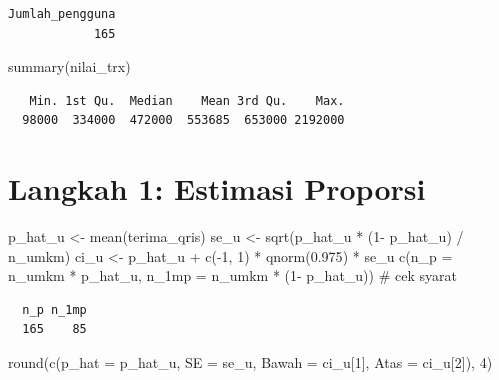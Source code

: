 \documentclass[
  indonesian,
  letterpaper,
]{book}
\newenvironment{Shaded}{\begin{snugshade}}{\end{snugshade}}
\newcommand{\AttributeTok}[1]{\textcolor[rgb]{0.40,0.45,0.13}{#1}}
\newcommand{\CommentTok}[1]{\textcolor[rgb]{0.37,0.37,0.37}{#1}}
\newcommand{\DecValTok}[1]{\textcolor[rgb]{0.68,0.00,0.00}{#1}}
\newcommand{\FloatTok}[1]{\textcolor[rgb]{0.68,0.00,0.00}{#1}}
\newcommand{\FunctionTok}[1]{\textcolor[rgb]{0.28,0.35,0.67}{#1}}
\newcommand{\NormalTok}[1]{\textcolor[rgb]{0.00,0.23,0.31}{#1}}
\newcommand{\OtherTok}[1]{\textcolor[rgb]{0.00,0.23,0.31}{#1}}
\newcommand{\SpecialCharTok}[1]{\textcolor[rgb]{0.37,0.37,0.37}{#1}}
\begin{document}
\begin{verbatim}
Jumlah_pengguna 
            165 
\end{verbatim}

\begin{Shaded}
\begin{Highlighting}[]
\FunctionTok{summary}\NormalTok{(nilai\_trx)}
\end{Highlighting}
\end{Shaded}

\begin{verbatim}
   Min. 1st Qu.  Median    Mean 3rd Qu.    Max. 
  98000  334000  472000  553685  653000 2192000 
\end{verbatim}

\section{Langkah 1: Estimasi
Proporsi}\label{langkah-1-estimasi-proporsi}

\begin{Shaded}
\begin{Highlighting}[]
\NormalTok{p\_hat\_u }\OtherTok{\textless{}{-}} \FunctionTok{mean}\NormalTok{(terima\_qris)}
\NormalTok{se\_u }\OtherTok{\textless{}{-}} \FunctionTok{sqrt}\NormalTok{(p\_hat\_u }\SpecialCharTok{*}\NormalTok{ (}\DecValTok{1}\SpecialCharTok{{-}}\NormalTok{ p\_hat\_u) }\SpecialCharTok{/}\NormalTok{ n\_umkm)}
\NormalTok{ci\_u }\OtherTok{\textless{}{-}}\NormalTok{ p\_hat\_u }\SpecialCharTok{+} \FunctionTok{c}\NormalTok{(}\SpecialCharTok{{-}}\DecValTok{1}\NormalTok{, }\DecValTok{1}\NormalTok{) }\SpecialCharTok{*} \FunctionTok{qnorm}\NormalTok{(}\FloatTok{0.975}\NormalTok{) }\SpecialCharTok{*}\NormalTok{ se\_u}
\FunctionTok{c}\NormalTok{(}\AttributeTok{n\_p =}\NormalTok{ n\_umkm }\SpecialCharTok{*}\NormalTok{ p\_hat\_u, }\AttributeTok{n\_1mp =}\NormalTok{ n\_umkm }\SpecialCharTok{*}\NormalTok{ (}\DecValTok{1}\SpecialCharTok{{-}}\NormalTok{ p\_hat\_u)) }\CommentTok{\# cek syarat}
\end{Highlighting}
\end{Shaded}

\begin{verbatim}
  n_p n_1mp 
  165    85 
\end{verbatim}

\begin{Shaded}
\begin{Highlighting}[]
\FunctionTok{round}\NormalTok{(}\FunctionTok{c}\NormalTok{(}\AttributeTok{p\_hat =}\NormalTok{ p\_hat\_u, }\AttributeTok{SE =}\NormalTok{ se\_u, }\AttributeTok{Bawah =}\NormalTok{ ci\_u[}\DecValTok{1}\NormalTok{], }\AttributeTok{Atas =}\NormalTok{ ci\_u[}\DecValTok{2}\NormalTok{]), }\DecValTok{4}\NormalTok{)}
\end{Highlighting}
\end{Shaded}
\end{document}
